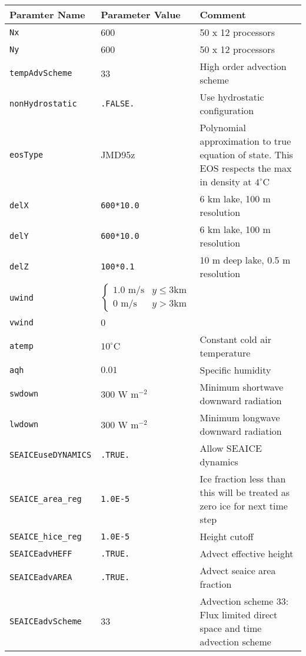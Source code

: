 \documentclass[11pt]{article}
\begin{document}
\begin{longtable}{  p{}  p{}  p{}  }
\hline
\textbf{Paramter Name} & \textbf{Parameter Value} & \textbf{Comment} \\ \hline \hline
\verb|Nx| & 600 & 50 x 12 processors \\ \hline
\verb|Ny| & 600 & 50 x 12 processors \\ \hline
\verb|tempAdvScheme|	&	33	&	High order advection scheme \\ \hline
\verb|nonHydrostatic| & \verb|.FALSE.| & Use hydrostatic configuration \\ \hline
\verb|eosType|		&	JMD95z	&	Polynomial approximation to true equation of state. This EOS respects the max in density at $4^{\circ} \textrm{C}$\\ \hline
\verb|delX|			&	\verb|600*10.0|	&	6 km lake, 100 m resolution \\ \hline
\verb|delY|			&	\verb|600*10.0|	&	6 km lake, 100 m resolution \\ \hline
\verb|delZ|			&	\verb|100*0.1 |	&	10 m deep lake, 0.5 m resolution \\ \hline

\verb|uwind|		&	\begin{equation*} \begin{cases} 1.0 \text{ m/s} & y \leq 3 \text{km} \\ 0 \text{ m/s} & y > 3 \text{km}   \end{cases} \end{equation*} & \\ \hline
\verb|vwind| 	& 0	& \\ \hline
\verb|atemp| 	& $10^{\circ} \text{C}$		& Constant cold air temperature \\ \hline
\verb|aqh| 		& $0.01$		&	Specific humidity \\ \hline
\verb|swdown| 	& $300 \text{ W} \text{ m}^{-2}$	& Minimum shortwave downward radiation \\ \hline
\verb|lwdown| 	& $300 \text{ W} \text{ m}^{-2}$	& Minimum longwave downward radiation \\ \hline

\verb|SEAICEuseDYNAMICS| & \verb|.TRUE.| & Allow SEAICE dynamics \\ \hline
\verb|SEAICE_area_reg|   & \verb|1.0E-5| & Ice fraction less than this will be treated as zero ice for next time step \\ \hline
\verb|SEAICE_hice_reg|   & \verb|1.0E-5| & Height cutoff \\ \hline
\verb|SEAICEadvHEFF|     & \verb|.TRUE.| & Advect effective height \\ \hline
\verb|SEAICEadvAREA|     & \verb|.TRUE.| & Advect seaice area fraction \\ \hline
\verb|SEAICEadvScheme|   & $33$			& Advection scheme 33: Flux limited direct space and time advection scheme \\ \hline


\end{longtable}
\end{document}
